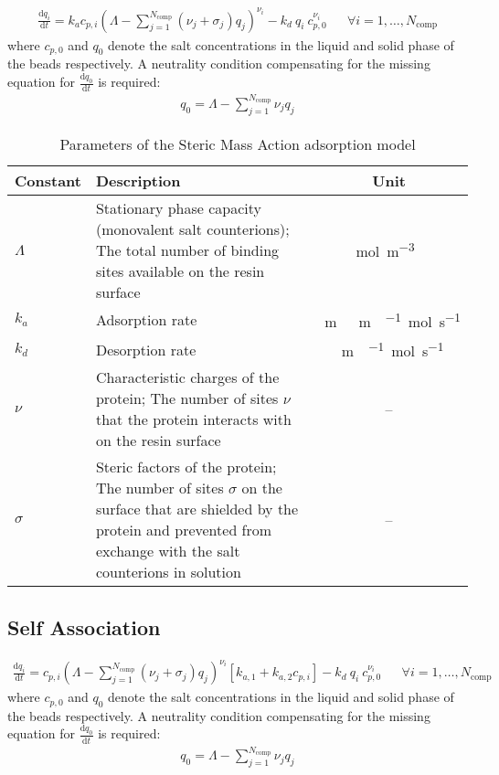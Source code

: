 \begin{align*}
  \frac{\mathrm{d} q_i}{\mathrm{d} t} = k_a c_{p,i}\left( \Lambda - \sum_{j=1}^{N_{\text{comp}}} \left( \nu_j + \sigma_j \right) q_j \right)^{\nu_i} - k_d\: q_i\: c_{p,0}^{\nu_i} && \forall i = 1, \dots, N_{\text{comp}}
\end{align*}
where $c_{p,0}$ and $q_0$ denote the salt concentrations in the liquid and solid phase of the beads respectively. A neutrality condition compensating for the missing equation for $\frac{\mathrm{d} q_0}{\mathrm{d}t}$ is required:
\begin{align*}
  q_0 = \Lambda - \sum_{j=1}^{N_{\text{comp}}} \nu_j q_j
\end{align*}

\begin{table}[!ht]
  \footnotesize
  \begin{tabu}to \linewidth[m]{lX[m]c}
    \toprule
      \textbf{Constant} & \textbf{Description} & \textbf{Unit} \\
    \midrule
      $\Lambda$ & Stationary phase capacity (monovalent salt counterions); The total number of binding sites available on the resin surface & \si{\mol\per\cubic\metre{}} \\ \midrule
      $k_a$ & Adsorption rate & \si{\metre{}\metre{}\per{}\mol\per\second} \\ \midrule
      $k_d$ & Desorption rate & \si{\metre{}\per{}\mol\per\second} \\ \midrule
      $\nu$ & Characteristic charges of the protein; The number of sites $\nu$ that the protein interacts with on the resin surface & -- \\ \midrule
      $\sigma$ & Steric factors of the protein; The number of sites $\sigma$ on the surface that are shielded by the protein and prevented from exchange with the salt counterions in solution & -- \\
    \bottomrule
  \end{tabu}
  \caption{Parameters of the Steric Mass Action adsorption model}
\end{table}

\subsection{Self Association}

\begin{align*}
  \frac{\mathrm{d} q_i}{\mathrm{d} t} = c_{p,i}\left( \Lambda - \sum_{j=1}^{N_{\text{comp}}} \left( \nu_j + \sigma_j \right) q_j \right)^{\nu_i} \left[ k_{a,1} + k_{a,2} c_{p,i} \right] - k_d\: q_i\: c_{p,0}^{\nu_i} && \forall i = 1, \dots, N_{\text{comp}}
\end{align*}
where $c_{p,0}$ and $q_0$ denote the salt concentrations in the liquid and solid phase of the beads respectively. A neutrality condition compensating for the missing equation for $\frac{\mathrm{d} q_0}{\mathrm{d}t}$ is required:
\begin{align*}
  q_0 = \Lambda - \sum_{j=1}^{N_{\text{comp}}} \nu_j q_j
\end{align*}

